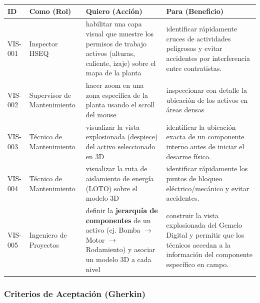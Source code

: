 \documentclass[12pt, a4paper]{article}
\begin{document}
\begin{longtable}{|p{2cm}|p{3.5cm}|p{5cm}|p{4.5cm}|}
\hline
\textbf{ID} & \textbf{Como (Rol)} & \textbf{Quiero (Acción)} & \textbf{Para (Beneficio)} \\ \hline
VIS-001 & Inspector HSEQ & habilitar una capa visual que muestre los permisos de trabajo activos (alturas, caliente, izaje) sobre el mapa de la planta & identificar rápidamente cruces de actividades peligrosas y evitar accidentes por interferencia entre contratistas. \\ \hline
VIS-002 & Supervisor de Mantenimiento & hacer zoom en una zona específica de la planta usando el scroll del mouse & inspeccionar con detalle la ubicación de los activos en áreas densas \\ \hline
VIS-003 & Técnico de Mantenimiento & visualizar la vista explosionada (despiece) del activo seleccionado en 3D & identificar la ubicación exacta de un componente interno antes de iniciar el desarme físico. \\ \hline
VIS-004 & Técnico de Mantenimiento & visualizar la ruta de aislamiento de energía (LOTO) sobre el modelo 3D & identificar rápidamente los puntos de bloqueo eléctrico/mecánico y evitar accidentes. \\ \hline
VIS-005 & Ingeniero de Proyectos & definir la \textbf{jerarquía de componentes} de un activo (ej. Bomba $\to$ Motor $\to$ Rodamiento) y asociar un modelo 3D a cada nivel & construir la vista explosionada del Gemelo Digital y permitir que los técnicos accedan a la información del componente específico en campo. \\ \hline
\end{longtable}

\subsubsection*{Criterios de Aceptación (Gherkin)}
\end{document}
